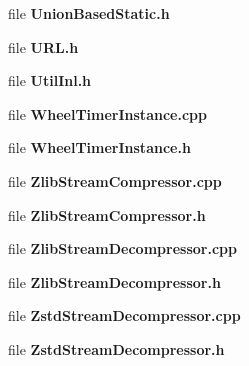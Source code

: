 \begin{DoxyCompactItemize}
\item 
file {\bf Union\+Based\+Static.\+h}
\item 
file {\bf U\+R\+L.\+h}
\item 
file {\bf Util\+Inl.\+h}
\item 
file {\bf Wheel\+Timer\+Instance.\+cpp}
\item 
file {\bf Wheel\+Timer\+Instance.\+h}
\item 
file {\bf Zlib\+Stream\+Compressor.\+cpp}
\item 
file {\bf Zlib\+Stream\+Compressor.\+h}
\item 
file {\bf Zlib\+Stream\+Decompressor.\+cpp}
\item 
file {\bf Zlib\+Stream\+Decompressor.\+h}
\item 
file {\bf Zstd\+Stream\+Decompressor.\+cpp}
\item 
file {\bf Zstd\+Stream\+Decompressor.\+h}
\end{DoxyCompactItemize}
